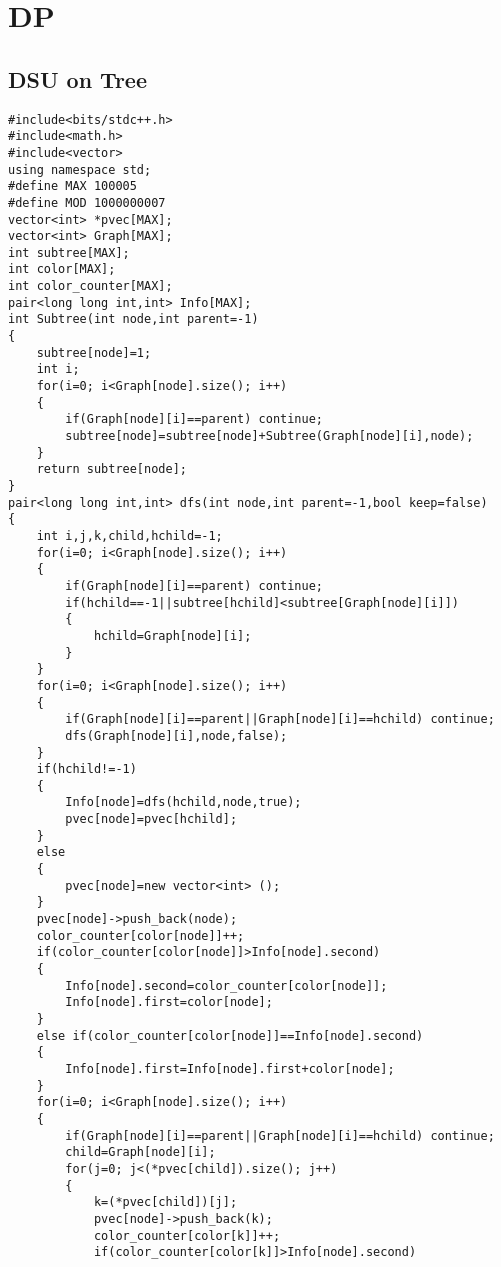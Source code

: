 \documentclass{article}
\begin{document}
\begin{multicols}{3}[]
\begin{tableofcontents}
\end{tableofcontents}

\section{DP}

\subsection{DSU on Tree}

\begin{verbatim}
#include<bits/stdc++.h>
#include<math.h>
#include<vector>
using namespace std;
#define MAX 100005
#define MOD 1000000007
vector<int> *pvec[MAX];
vector<int> Graph[MAX];
int subtree[MAX];
int color[MAX];
int color_counter[MAX];
pair<long long int,int> Info[MAX];
int Subtree(int node,int parent=-1)
{
    subtree[node]=1;
    int i;
    for(i=0; i<Graph[node].size(); i++)
    {
        if(Graph[node][i]==parent) continue;
        subtree[node]=subtree[node]+Subtree(Graph[node][i],node);
    }
    return subtree[node];
}
pair<long long int,int> dfs(int node,int parent=-1,bool keep=false)
{
    int i,j,k,child,hchild=-1;
    for(i=0; i<Graph[node].size(); i++)
    {
        if(Graph[node][i]==parent) continue;
        if(hchild==-1||subtree[hchild]<subtree[Graph[node][i]])
        {
            hchild=Graph[node][i];
        }
    }
    for(i=0; i<Graph[node].size(); i++)
    {
        if(Graph[node][i]==parent||Graph[node][i]==hchild) continue;
        dfs(Graph[node][i],node,false);
    }
    if(hchild!=-1)
    {
        Info[node]=dfs(hchild,node,true);
        pvec[node]=pvec[hchild];
    }
    else
    {
        pvec[node]=new vector<int> ();
    }
    pvec[node]->push_back(node);
    color_counter[color[node]]++;
    if(color_counter[color[node]]>Info[node].second)
    {
        Info[node].second=color_counter[color[node]];
        Info[node].first=color[node];
    }
    else if(color_counter[color[node]]==Info[node].second)
    {
        Info[node].first=Info[node].first+color[node];
    }
    for(i=0; i<Graph[node].size(); i++)
    {
        if(Graph[node][i]==parent||Graph[node][i]==hchild) continue;
        child=Graph[node][i];
        for(j=0; j<(*pvec[child]).size(); j++)
        {
            k=(*pvec[child])[j];
            pvec[node]->push_back(k);
            color_counter[color[k]]++;
            if(color_counter[color[k]]>Info[node].second)

\end{verbatim}
\end{multicols}
\end{document}

